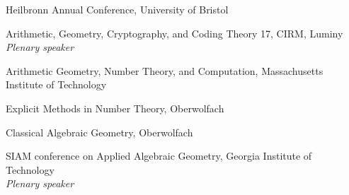 \documentclass[12pt]{article}
\newenvironment{date_section}
	{
	\vspace{-1ex}
	\leftmargini = 15ex
	 \begin{itemize}[
		 labelsep = *,
		 labelwidth = 9ex,
		 labelindent = 0ex,
		 itemindent = !,
		 font=\normalfont, 
		 align=parleft
		 ]
		{}
		\itemsep=-1.5mm}
	{\end{itemize}\vspace{-2ex}}
\newcommand{\yearmo}[2]{
	\item[ 
		{\makebox[1ex][r]{#1}}
		\hspace{1ex}
		{\makebox[1ex][l]{#2} }
		] }
\begin{document}
\begin{date_section}

			\yearmo{}{}
			Heilbronn Annual Conference, University of Bristol 


			\yearmo{}{} 
			Arithmetic, Geometry, Cryptography, and Coding Theory 17, 			CIRM, Luminy\\
			\textit{Plenary speaker}




			\yearmo{}{2018}
			Arithmetic Geometry, Number Theory, and Computation, Massachusetts Institute of Technology

			\yearmo{}{}
			Explicit Methods in Number Theory, Oberwolfach

			\yearmo{}{}
			Classical Algebraic Geometry, Oberwolfach
            
			\yearmo{}{2017}
			SIAM conference on Applied Algebraic Geometry, Georgia Institute of Technology\\
			\textit{Plenary speaker}




	
                        

\end{date_section}
\end{document}
